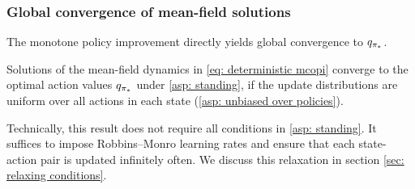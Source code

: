 \subsubsection{Global convergence of mean-field solutions}

The monotone policy improvement directly yields global convergence to $q_{{\pi}_*}$.

\begin{proposition}
\label{thm: convergence deterministic mcopi}
    Solutions of the mean-field dynamics in \eqref{eq: deterministic mcopi} converge to the optimal action values $q_{{\pi}_*}$
    under \autoref{asp: standing},
    if the update distributions are uniform over all actions in each state (\autoref{asp: unbiased over policies}).
\end{proposition}

Technically, this result does not require all conditions in \autoref{asp: standing}. It suffices to impose Robbins--Monro learning rates and ensure that each state-action pair is updated infinitely often. We discuss this relaxation in section \ref{sec: relaxing conditions}.






